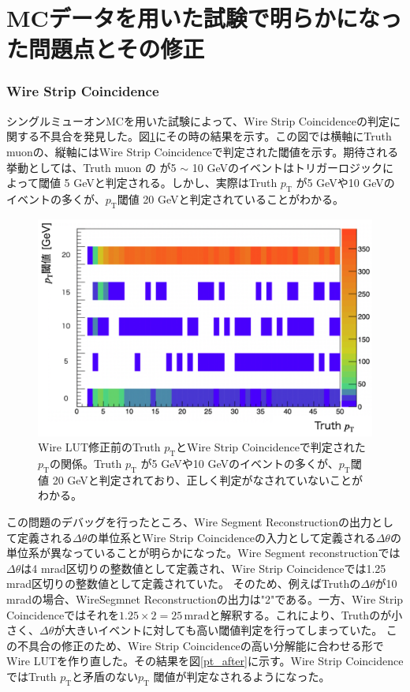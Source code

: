 \clearpage
\section{MCデータを用いた試験で明らかになった問題点とその修正}
\label{sec:appendix:MC-test}
\subsubsection{Wire Strip Coincidence}
シングルミューオンMCを用いた試験によって、Wire Strip Coincidenceの\pt 判定に関する不具合を発見した。図\ref{pt_before}にその時の結果を示す。この図では横軸にTruth muonの\pt、縦軸にはWire Strip Coincidenceで判定された\pt 閾値を示す。期待される挙動としては、Truth muon の \pt が5 $\sim$ 10 GeVのイベントはトリガーロジックによって\pt 閾値 5 GeVと判定される。しかし、実際はTruth $p_\mathrm{T}$ が5 GeVや10 GeVのイベントの多くが、$p_\mathrm{T}$閾値 20 GeVと判定されていることがわかる。

\begin{figure} 
\centering
\includegraphics[width=16cm]{fig/Test/pt_before.png}
\caption[]{Wire LUT修正前のTruth $p_\mathrm{T}$とWire Strip Coincidenceで判定された$p_\mathrm{T}$の関係。Truth $p_\mathrm{T}$ が5 GeVや10 GeVのイベントの多くが、$p_\mathrm{T}$閾値 20 GeVと判定されており、正しく\pt 判定がなされていないことがわかる。}
\label{pt_before}
\end{figure}

この問題のデバッグを行ったところ、Wire Segment Reconstructionの出力として定義される$\Delta\theta$の単位系とWire Strip Coincidenceの入力として定義される$\Delta\theta$の単位系が異なっていることが明らかになった。Wire Segment reconstructionでは$\Delta\theta$は4 mrad区切りの整数値として定義され、Wire Strip Coincidenceでは1.25 mrad区切りの整数値として定義されていた。
そのため、例えばTruthの$\Delta\theta$が10 mradの場合、WireSegmnet Reconstructionの出力は"2"である。一方、Wire Strip Coincidenceではそれを$1.25 \times 2 = 25\,\mathrm{mrad}$と解釈する。これにより、Truthの\pt が小さく、$\Delta\theta$が大きいイベントに対しても高い\pt 閾値判定を行ってしまっていた。
この不具合の修正のため、Wire Strip Coincidenceの高い分解能に合わせる形でWire LUTを作り直した。その結果を図\ref{pt_after}に示す。Wire Strip CoincidenceではTruth $p_\mathrm{T}$と矛盾のない$p_\mathrm{T}$ 閾値が判定なされるようになった。
 
